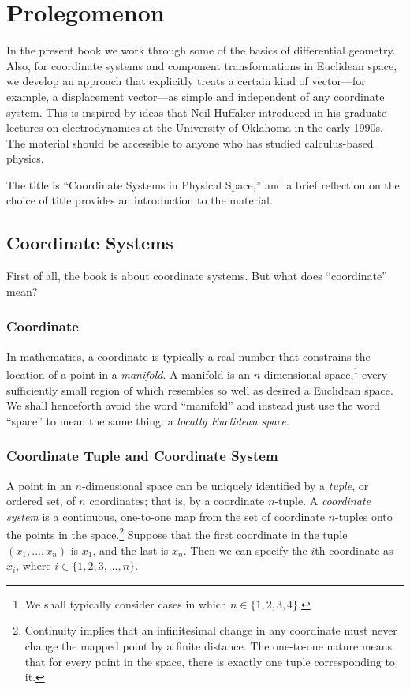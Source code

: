 

\chapter{Prolegomenon}

In the present book we work through some of the basics of differential
geometry.  Also, for coordinate systems and component transformations in
Euclidean space, we develop an approach that explicitly treats a certain kind
of vector---for example, a displacement vector---as simple and independent of
any coordinate system.  This is inspired by ideas that Neil Huffaker introduced
in his graduate lectures on electrodynamics at the University of Oklahoma in
the early 1990s.  The material should be accessible to anyone who has studied
calculus-based physics.

The title is ``Coordinate Systems in Physical Space,'' and a brief reflection
on the choice of title provides an introduction to the material.

\section{Coordinate Systems}

First of all, the book is about coordinate systems.  But what does
``coordinate'' mean?

\subsection{Coordinate}

In mathematics, a coordinate is typically a real number that constrains the
location of a point in a \emph{manifold}.  A manifold is an $n$-dimensional
space,\footnote{%
   We shall typically consider cases in which $n \in \{1, 2, 3, 4\}$.%
}
every sufficiently small region of which resembles so well as desired a
Euclidean space.  We shall henceforth avoid the word ``manifold'' and instead
just use the word ``space'' to mean the same thing: a \emph{locally Euclidean
space}.

\subsection{Coordinate Tuple and Coordinate System}

A point in an $n$-dimensional space can be uniquely identified by a
\emph{tuple}, or ordered set, of $n$ coordinates; that is, by a coordinate
$n$-tuple.  A \emph{coordinate system} is a continuous, one-to-one map from the
set of coordinate $n$-tuples onto the points in the space.\footnote{%
   Continuity implies that an infinitesimal change in any coordinate must never
   change the mapped point by a finite distance.  The one-to-one nature means
   that for every point in the space, there is exactly one tuple corresponding
   to it.%
}
Suppose that the first coordinate in the tuple $(x_1, \ldots, x_n)$ is $x_1$,
and the last is $x_n$.  Then we can specify the $i$th coordinate as $x_i$,
where $i \in \{1, 2, 3, \ldots, n\}$.


